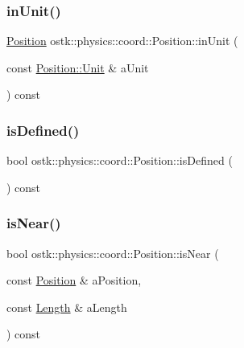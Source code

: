 \mbox{\label{classostk_1_1physics_1_1coord_1_1_position_a91baafa3dbbd48de681204c1c437ea35}} 
\subsubsection{\texorpdfstring{in\+Unit()}{inUnit()}}
{\footnotesize\ttfamily \hyperlink{classostk_1_1physics_1_1coord_1_1_position}{Position} ostk\+::physics\+::coord\+::\+Position\+::in\+Unit (\begin{DoxyParamCaption}\item[{const \hyperlink{classostk_1_1physics_1_1units_1_1_length_a2664470a7eedf5d45c88861fe69badea}{Position\+::\+Unit} \&}]{a\+Unit }\end{DoxyParamCaption}) const}

\mbox{\label{classostk_1_1physics_1_1coord_1_1_position_a969585edcf7795bbb6f4e62a10b2885b}} 
\subsubsection{\texorpdfstring{is\+Defined()}{isDefined()}}
{\footnotesize\ttfamily bool ostk\+::physics\+::coord\+::\+Position\+::is\+Defined (\begin{DoxyParamCaption}{ }\end{DoxyParamCaption}) const}

\mbox{\label{classostk_1_1physics_1_1coord_1_1_position_a9ed9c1f90cb058db0e79bd648296c2b5}} 
\subsubsection{\texorpdfstring{is\+Near()}{isNear()}}
{\footnotesize\ttfamily bool ostk\+::physics\+::coord\+::\+Position\+::is\+Near (\begin{DoxyParamCaption}\item[{const \hyperlink{classostk_1_1physics_1_1coord_1_1_position}{Position} \&}]{a\+Position,  }\item[{const \hyperlink{classostk_1_1physics_1_1units_1_1_length}{Length} \&}]{a\+Length }\end{DoxyParamCaption}) const}

